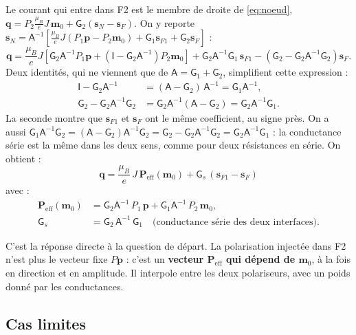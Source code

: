\documentclass[11pt,a4paper]{article}
\newcommand{\vm}{\bm{m}}
\newcommand{\vp}{\bm{p}}
\newcommand{\vs}{\bm{s}}
\newcommand{\vq}{\bm{q}}
\newcommand{\mG}{\mathsf{G}}
\newcommand{\mA}{\mathsf{A}}
\newcommand{\Id}{\mathsf{I}}
\begin{document}
Le courant qui entre dans F2 est le membre de droite de \eqref{eq:noeud},
$\vq = P_2\frac{\mu_B}{e}J\,\vm_0 + \mG_2(\vs_N-\vs_F)$. On y reporte
$\vs_N = \mA^{-1}\left[\frac{\mu_B}{e}J(P_1\vp - P_2\vm_0) + \mG_1\vs_{F1}
+ \mG_2\vs_F\right]$ :
\begin{equation}
  \vq = \frac{\mu_B}{e}J\left[\mG_2\mA^{-1}P_1\vp
  + \left(\Id-\mG_2\mA^{-1}\right)P_2\vm_0\right]
  + \mG_2\mA^{-1}\mG_1\,\vs_{F1}
  - \left(\mG_2 - \mG_2\mA^{-1}\mG_2\right)\vs_F .
\end{equation}
Deux identités, qui ne viennent que de $\mA = \mG_1+\mG_2$, simplifient
cette expression :
\begin{align}
  \Id-\mG_2\mA^{-1} &= (\mA-\mG_2)\,\mA^{-1} = \mG_1\mA^{-1},\\
  \mG_2 - \mG_2\mA^{-1}\mG_2 &= \mG_2\mA^{-1}(\mA-\mG_2) = \mG_2\mA^{-1}\mG_1 .
\end{align}
La seconde montre que $\vs_{F1}$ et $\vs_F$ ont le même coefficient, au signe
près. On a aussi $\mG_1\mA^{-1}\mG_2 = (\mA-\mG_2)\mA^{-1}\mG_2 = \mG_2 -
\mG_2\mA^{-1}\mG_2 = \mG_2\mA^{-1}\mG_1$ : la conductance série est la même
dans les deux sens, comme pour deux résistances en série. On obtient :
\begin{equation}
  \boxed{\;
  \vq = \frac{\mu_B}{e}\,J\,\bm{P}_{\!\mathrm{eff}}(\vm_0)
  + \mG_s\,\left(\vs_{F1}-\vs_F\right)
  \;}
  \label{eq:robin-eff}
\end{equation}
avec :
\begin{align}
  \bm{P}_{\!\mathrm{eff}}(\vm_0) &= \mG_2\mA^{-1}\,P_1\,\vp
  + \mG_1\mA^{-1}\,P_2\,\vm_0,
  \label{eq:Peff}\\
  \mG_s &= \mG_2\,\mA^{-1}\,\mG_1
  \quad\text{(conductance série des deux interfaces).}
\end{align}

C'est la réponse directe à la question de départ. La polarisation injectée
dans F2 n'est plus le vecteur fixe $P\vp$ : c'est un \textbf{vecteur
$\bm{P}_{\!\mathrm{eff}}$ qui dépend de $\vm_0$}, à la fois en direction et
en amplitude. Il interpole entre les deux polariseurs, avec un poids
donné par les conductances.

\subsection{Cas limites}
\end{document}
